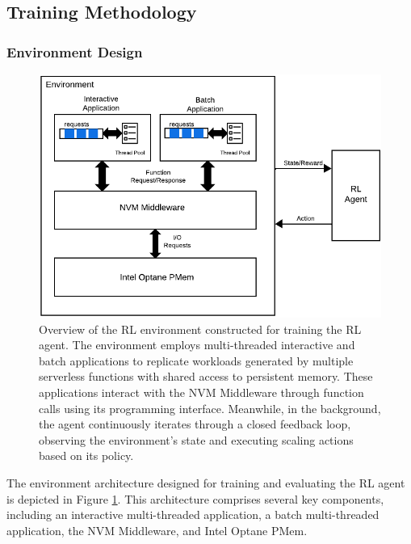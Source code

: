 \subsection{Training Methodology}

\subsubsection{Environment Design}

\begin{figure}[ht]
  \centering
  \includegraphics[width=1\textwidth]{images/rl_environment_architecture.png}
  \caption[Overview of the Reinforcement Learning Environment]{Overview of the RL environment constructed for training the RL agent. The environment employs multi-threaded interactive and batch applications to replicate workloads generated by multiple serverless functions with shared access to persistent memory. These applications interact with the NVM Middleware through function calls using its programming interface. Meanwhile, in the background, the agent continuously iterates through a closed feedback loop, observing the environment's state and executing scaling actions based on its policy.}
  \label{fig:rl_environment_architecture}
\end{figure}

The environment architecture designed for training and evaluating the RL agent is depicted in Figure \ref{fig:rl_environment_architecture}. This architecture comprises several key components, including an interactive multi-threaded application, a batch multi-threaded application, the NVM Middleware, and Intel Optane PMem.

